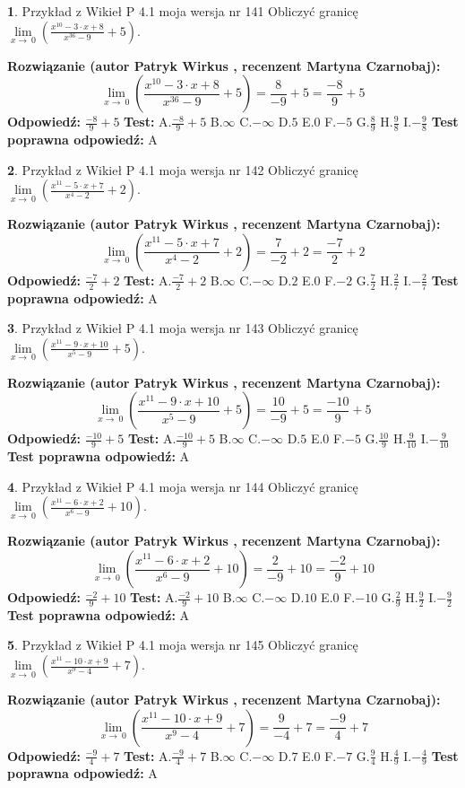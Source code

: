 \documentclass[12pt, a4paper]{article}
\theoremstyle{definition} %
\newtheorem{zad}{}
\newcommand{\zadStart}[1]{\begin{zad}#1\newline}
\newcommand{\zadStop}{\end{zad}}
\newcommand{\rozwStart}[2]{\noindent \textbf{Rozwiązanie (autor #1 , recenzent #2): }\newline}
\newcommand{\rozwStop}{\newline}
\newcommand{\odpStart}{\noindent \textbf{Odpowiedź:}\newline}
\newcommand{\odpStop}{\newline}
\newcommand{\testStart}{\noindent \textbf{Test:}\newline}
\newcommand{\testStop}{\newline}
\newcommand{\kluczStart}{\noindent \textbf{Test poprawna odpowiedź:}\newline}
\newcommand{\kluczStop}{\newline}
\begin{document}
\zadStart{Przykład z Wikieł P 4.1 moja wersja nr 141}
Obliczyć granicę $\lim\limits_{x\to\ 0}(\frac{x^{10}-3 \cdot x +8}{x^{36}-9}+5)$.
\zadStop
\rozwStart{Patryk Wirkus}{Martyna Czarnobaj}
$$\lim\limits_{x\to\ 0}(\frac{x^{10}-3 \cdot x +8}{x^{36}-9}+5)=\frac{8}{-9}+5=\frac{-8}{9}+5$$
\rozwStop
\odpStart
$\frac{-8}{9}+5$
\odpStop
\testStart
A.$\frac{-8}{9}+5$
B.$\infty$
C.$-\infty$
D.$5$
E.$0$
F.$-5$
G.$\frac{8}{9}$
H.$\frac{9}{8}$
I.$-\frac{9}{8}$
\testStop
\kluczStart
A
\kluczStop



\zadStart{Przykład z Wikieł P 4.1 moja wersja nr 142}
Obliczyć granicę $\lim\limits_{x\to\ 0}(\frac{x^{11}-5 \cdot x +7}{x^{4}-2}+2)$.
\zadStop
\rozwStart{Patryk Wirkus}{Martyna Czarnobaj}
$$\lim\limits_{x\to\ 0}(\frac{x^{11}-5 \cdot x +7}{x^{4}-2}+2)=\frac{7}{-2}+2=\frac{-7}{2}+2$$
\rozwStop
\odpStart
$\frac{-7}{2}+2$
\odpStop
\testStart
A.$\frac{-7}{2}+2$
B.$\infty$
C.$-\infty$
D.$2$
E.$0$
F.$-2$
G.$\frac{7}{2}$
H.$\frac{2}{7}$
I.$-\frac{2}{7}$
\testStop
\kluczStart
A
\kluczStop



\zadStart{Przykład z Wikieł P 4.1 moja wersja nr 143}
Obliczyć granicę $\lim\limits_{x\to\ 0}(\frac{x^{11}-9 \cdot x +10}{x^{5}-9}+5)$.
\zadStop
\rozwStart{Patryk Wirkus}{Martyna Czarnobaj}
$$\lim\limits_{x\to\ 0}(\frac{x^{11}-9 \cdot x +10}{x^{5}-9}+5)=\frac{10}{-9}+5=\frac{-10}{9}+5$$
\rozwStop
\odpStart
$\frac{-10}{9}+5$
\odpStop
\testStart
A.$\frac{-10}{9}+5$
B.$\infty$
C.$-\infty$
D.$5$
E.$0$
F.$-5$
G.$\frac{10}{9}$
H.$\frac{9}{10}$
I.$-\frac{9}{10}$
\testStop
\kluczStart
A
\kluczStop



\zadStart{Przykład z Wikieł P 4.1 moja wersja nr 144}
Obliczyć granicę $\lim\limits_{x\to\ 0}(\frac{x^{11}-6 \cdot x +2}{x^{6}-9}+10)$.
\zadStop
\rozwStart{Patryk Wirkus}{Martyna Czarnobaj}
$$\lim\limits_{x\to\ 0}(\frac{x^{11}-6 \cdot x +2}{x^{6}-9}+10)=\frac{2}{-9}+10=\frac{-2}{9}+10$$
\rozwStop
\odpStart
$\frac{-2}{9}+10$
\odpStop
\testStart
A.$\frac{-2}{9}+10$
B.$\infty$
C.$-\infty$
D.$10$
E.$0$
F.$-10$
G.$\frac{2}{9}$
H.$\frac{9}{2}$
I.$-\frac{9}{2}$
\testStop
\kluczStart
A
\kluczStop



\zadStart{Przykład z Wikieł P 4.1 moja wersja nr 145}
Obliczyć granicę $\lim\limits_{x\to\ 0}(\frac{x^{11}-10 \cdot x +9}{x^{9}-4}+7)$.
\zadStop
\rozwStart{Patryk Wirkus}{Martyna Czarnobaj}
$$\lim\limits_{x\to\ 0}(\frac{x^{11}-10 \cdot x +9}{x^{9}-4}+7)=\frac{9}{-4}+7=\frac{-9}{4}+7$$
\rozwStop
\odpStart
$\frac{-9}{4}+7$
\odpStop
\testStart
A.$\frac{-9}{4}+7$
B.$\infty$
C.$-\infty$
D.$7$
E.$0$
F.$-7$
G.$\frac{9}{4}$
H.$\frac{4}{9}$
I.$-\frac{4}{9}$
\testStop
\kluczStart
A
\kluczStop
\end{document}
